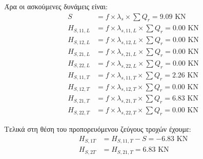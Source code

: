 Άρα οι ασκούμενες δυνάμεις είναι:
\begin{align*}
S                &= f \times λ_s \times \sum{Q_r} =   9.09 \text{ KN} \\ 
H_{S,11,L}       &= f \times λ_{s,11,L} \times \sum{Q_r} =   0.00 \text{ KN} \\ 
H_{S,12,L}       &= f \times λ_{s,12,L} \times \sum{Q_r} =   0.00 \text{ KN} \\ 
H_{S,21,L}       &= f \times λ_{s,21,L} \times \sum{Q_r} =   0.00 \text{ KN} \\ 
H_{S,22,L}       &= f \times λ_{s,22,L} \times \sum{Q_r} =   0.00 \text{ KN} \\ 
H_{S,11,T}       &= f \times λ_{s,11,T} \times \sum{Q_r} =   2.26 \text{ KN} \\ 
H_{S,12,T}       &= f \times λ_{s,12,T} \times \sum{Q_r} =   0.00 \text{ KN} \\ 
H_{S,21,T}       &= f \times λ_{s,21,T} \times \sum{Q_r} =   6.83 \text{ KN} \\ 
H_{S,22,T}       &= f \times λ_{s,22,T} \times \sum{Q_r} =   0.00 \text{ KN} 
\end{align*}

Τελικά στη θέση του προπορευόμενου ζεύγους τροχών έχουμε:
\begin{align*}
H_{S,1T} &= H_{S,11,T} - S =  -6.83 \text{ KN} \\
H_{S,2T} &= H_{S,21,T} =   6.83 \text{ KN}
\end{align*}
